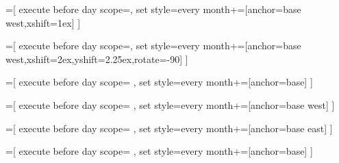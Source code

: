 =[%
execute before day scope={},
  set style={{every month}+=[anchor=base west,xshift=1ex]}
]

=[%
  execute before day scope={},
  set style={{every month}+=[anchor=base west,xshift=2ex,yshift=2.25ex,rotate=-90]}
]

=[%
  execute before day scope={%
    },
  set style={{every month}+=[anchor=base]}
]
  
=[%
  execute before day scope={%
    },
  set style={{every month}+=[anchor=base west]}
]



=[%
  execute before day scope={%
    },
  set style={{every month}+=[anchor=base east]}
]
  
=[%
  execute before day scope={%
    },
  set style={{every month}+=[anchor=base]}
]
  
